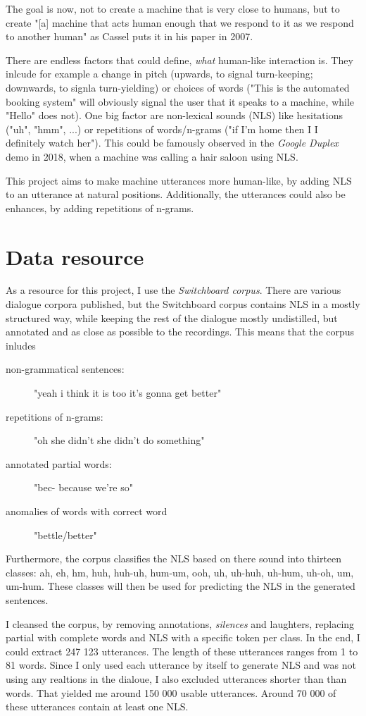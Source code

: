 \documentclass[
	11pt, %
]{fphw}
\begin{document}
The goal is now, not to create a machine that is very close to humans, but to create "[a] machine that acts human enough that we respond to it as we respond to another human" as Cassel puts it in his paper in 2007.

There are endless factors that could define, \emph{what} human-like interaction is. They inlcude for example a change in pitch (upwards, to signal turn-keeping; downwards, to signla turn-yielding) or choices of words ("This is the automated booking system" will obviously signal the user that it speaks to a machine, while "Hello" does not). One big factor are non-lexical sounds (NLS) like hesitations ("uh", "hmm", ...) or repetitions of words/n-grams ("if I'm home then I I definitely watch her"). This could be famously observed in the \emph{Google Duplex} demo in 2018, when a machine was calling a hair saloon using NLS.

This project aims to make machine utterances more human-like, by adding NLS to an utterance at natural positions. Additionally, the utterances could also be enhances, by adding repetitions of n-grams.

\section*{Data resource}
As a resource for this project, I use the \emph{Switchboard corpus}. There are various dialogue corpora published, but the Switchboard corpus contains NLS in a mostly structured way, while keeping the rest of the dialogue mostly undistilled, but annotated and as close as possible to the recordings. This means that the corpus inludes
\begin{description}
    \item[non-grammatical sentences:] "yeah i think it is too it's gonna get better"
    \item[repetitions of n-grams:] "oh she didn't she didn't do something"
    \item[annotated partial words:] "bec- because we're so"
    \item[anomalies of words with correct word] "bettle/better"
\end{description}

Furthermore, the corpus classifies the NLS based on there sound into thirteen classes: ah, eh, hm, huh, huh-uh, hum-um, ooh, uh, uh-huh, uh-hum, uh-oh, um, um-hum. These classes will then be used for predicting the NLS in the generated sentences.

I cleansed the corpus, by removing annotations, \emph{silences} and laughters, replacing partial with complete words and NLS with a specific token per class. In the end, I could extract 247 123 utterances. The length of these utterances ranges from 1 to 81 words. Since I only used each utterance by itself to generate NLS and was not using any realtions in the dialoue, I also excluded utterances shorter than than words. That yielded me around 150 000 usable utterances. Around 70 000 of these utterances contain at least one NLS.
\end{document}
